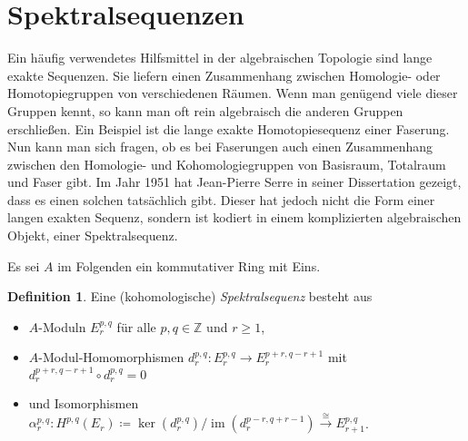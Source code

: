 \documentclass[11pt, a4paper, german]{article}
\theoremstyle{definition}
\newtheorem{defn}{Definition}
\theoremstyle{remark}
\newcommand{\Z}{\mathbb{Z}} %
\DeclareMathOperator{\im}{im} %
\newcommand{\ES}{Es sei} %
\begin{document}
\section{Spektralsequenzen}

Ein häufig verwendetes Hilfsmittel in der algebraischen Topologie sind lange exakte Sequenzen.
Sie liefern einen Zusammenhang zwischen Homologie- oder Homotopiegruppen von verschiedenen Räumen.
Wenn man genügend viele dieser Gruppen kennt, so kann man oft rein algebraisch die anderen Gruppen erschließen.
Ein Beispiel ist die lange exakte Homotopiesequenz einer Faserung.
Nun kann man sich fragen, ob es bei Faserungen auch einen Zusammenhang zwischen den Homologie- und Kohomologiegruppen von Basisraum, Totalraum und Faser gibt.
Im Jahr 1951 hat Jean-Pierre Serre in seiner Dissertation \cite{serre:thesis} gezeigt, dass es einen solchen tatsächlich gibt.
Dieser hat jedoch nicht die Form einer langen exakten Sequenz, sondern ist kodiert in einem komplizierten algebraischen Objekt, einer Spektralsequenz.

\ES{} $A$ im Folgenden ein kommutativer Ring mit Eins.

\begin{defn}
  Eine (kohomologische) \emph{Spektralsequenz} besteht aus
  \begin{itemize}
    \item $A$-Moduln $E_r^{p,q}$ für alle $p, q \in \Z$ und $r \geq 1$,
    \item $A$-Modul-Homomorphismen $d_r^{p,q} : E_r^{p,q} \to E_r^{p+r,q-r+1}$ mit $d_r^{p+r,q-r+1} \circ d_r^{p,q} = 0$
    \item und Isomorphismen $\alpha_r^{p,q} : H^{p,q}(E_r) \!\coloneqq\! \ker(d_r^{p,q}) / \im(d_r^{p-r,q+r-1}) \xrightarrow{\cong} E_{r+1}^{p,q}$.
  \end{itemize}
\end{defn}
\end{document}

